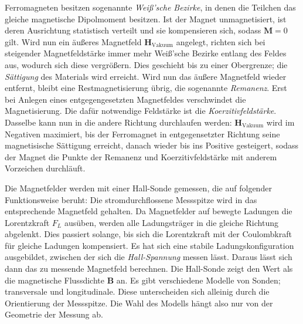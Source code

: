 Ferromagneten besitzen sogenannte \textit{Weiß'sche Bezirke}, in denen die Teilchen das gleiche magnetische Dipolmoment besitzen. 
Ist der Magnet unmagnetisiert, ist deren Ausrichtung statistisch verteilt und sie kompensieren sich, sodass $\symbf{M}=0$ gilt. %
Wird nun ein äußeres Magnetfeld $\symbf{H}_\text{Vakuum}$ angelegt, richten sich bei steigender Magnetfeldstärke immer mehr Weiß'sche Bezirke entlang des 
Feldes aus, wodurch sich diese vergrößern. 
Dies geschieht bis zu einer Obergrenze; die \textit{Sättigung} des Materials wird erreicht. 
Wird nun %
das äußere Magnetfeld wieder entfernt, bleibt eine Restmagnetisierung übrig, 
die sogenannte \textit{Remanenz}. 
Erst bei Anlegen eines entgegengesetzten Magnetfeldes verschwindet die Magnetisierung. 
Die dafür notwendige Feldstärke ist die \textit{Koerzitivfeldstärke}. %
Dasselbe kann nun in die andere Richtung durchlaufen werden: $\symbf{H}_\text{Vakuum}$ wird im Negativen 
maximiert, bis der Ferromagnet in entgegensetzter Richtung seine magnetisische Sättigung erreicht, danach wieder 
bis ins Positive gesteigert, sodass der Magnet die Punkte der Remanenz und Koerzitivfeldstärke mit anderem Vorzeichen 
durchläuft. 

Die Magnetfelder werden mit einer Hall-Sonde gemessen, die auf folgender Funktionsweise beruht:
Die stromdurchflossene Messspitze wird in das entsprechende Magnetfeld gehalten.
Da Magnetfelder auf bewegte Ladungen die Lorentzkraft $F_L$ ausüben, werden %
alle Ladungsträger in die gleiche Richtung
abgelenkt. Dies passiert solange, bis sich die Lorentzkraft mit %
der Coulombkraft für gleiche Ladungen kompensiert.
Es hat sich eine stabile Ladungskonfiguration ausgebildet, zwischen der sich die \textit{Hall-Spannung} 
messen lässt. Daraus lässt sich dann das zu messende Magnetfeld berechnen. Die Hall-Sonde zeigt den %
Wert als die magnetische Flussdichte $\symbf{B}$ an. 
Es gibt verschiedene Modelle von Sonden; transversale und longitudinale. Diese unterscheiden sich alleinig durch die 
Orientierung der Messspitze. Die Wahl des Modells hängt also nur von der Geometrie der Messung ab. %


